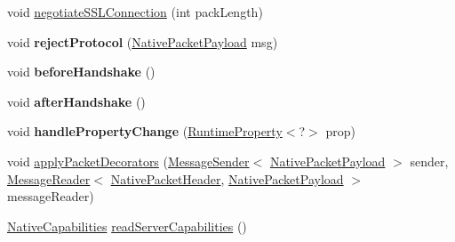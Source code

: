 \begin{DoxyCompactItemize}
\item 
void \mbox{\hyperlink{classcom_1_1mysql_1_1cj_1_1protocol_1_1a_1_1_native_protocol_a176849031728bdd55f4904b7a38ffa99}{negotiate\+S\+S\+L\+Connection}} (int pack\+Length)
\item 
\mbox{\label{classcom_1_1mysql_1_1cj_1_1protocol_1_1a_1_1_native_protocol_a8283407fa3022adc16c70f9c62e8d9ca}} 
void {\bfseries reject\+Protocol} (\mbox{\hyperlink{classcom_1_1mysql_1_1cj_1_1protocol_1_1a_1_1_native_packet_payload}{Native\+Packet\+Payload}} msg)
\item 
\mbox{\label{classcom_1_1mysql_1_1cj_1_1protocol_1_1a_1_1_native_protocol_a30895f4669b803d40bfc8dd8d3f1dd32}} 
void {\bfseries before\+Handshake} ()
\item 
\mbox{\label{classcom_1_1mysql_1_1cj_1_1protocol_1_1a_1_1_native_protocol_a085d0d9db853b6e0ba5a88f52e19a3ed}} 
void {\bfseries after\+Handshake} ()
\item 
\mbox{\label{classcom_1_1mysql_1_1cj_1_1protocol_1_1a_1_1_native_protocol_a8ca553b8932948c32622bb09d58df2f5}} 
void {\bfseries handle\+Property\+Change} (\mbox{\hyperlink{interfacecom_1_1mysql_1_1cj_1_1conf_1_1_runtime_property}{Runtime\+Property}}$<$?$>$ prop)
\item 
void \mbox{\hyperlink{classcom_1_1mysql_1_1cj_1_1protocol_1_1a_1_1_native_protocol_aebf9cad7c22da41d696066a75e768eed}{apply\+Packet\+Decorators}} (\mbox{\hyperlink{interfacecom_1_1mysql_1_1cj_1_1protocol_1_1_message_sender}{Message\+Sender}}$<$ \mbox{\hyperlink{classcom_1_1mysql_1_1cj_1_1protocol_1_1a_1_1_native_packet_payload}{Native\+Packet\+Payload}} $>$ sender, \mbox{\hyperlink{interfacecom_1_1mysql_1_1cj_1_1protocol_1_1_message_reader}{Message\+Reader}}$<$ \mbox{\hyperlink{classcom_1_1mysql_1_1cj_1_1protocol_1_1a_1_1_native_packet_header}{Native\+Packet\+Header}}, \mbox{\hyperlink{classcom_1_1mysql_1_1cj_1_1protocol_1_1a_1_1_native_packet_payload}{Native\+Packet\+Payload}} $>$ message\+Reader)
\item 
\mbox{\hyperlink{classcom_1_1mysql_1_1cj_1_1protocol_1_1a_1_1_native_capabilities}{Native\+Capabilities}} \mbox{\hyperlink{classcom_1_1mysql_1_1cj_1_1protocol_1_1a_1_1_native_protocol_acfce17a81631146efc0ca8d9cef22880}{read\+Server\+Capabilities}} ()

\end{DoxyCompactItemize}
